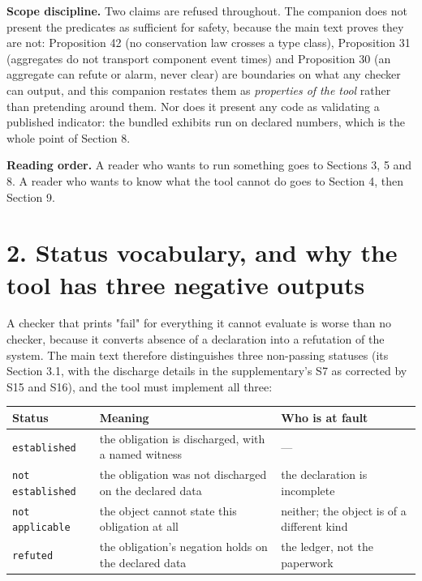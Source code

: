 \documentclass[11pt]{article}
\begin{document}
\textbf{Scope discipline.} Two claims are refused throughout. The companion does not present the predicates as sufficient for safety, because the main text proves they are not: Proposition 42 (no conservation law crosses a type class), Proposition 31 (aggregates do not transport component event times) and Proposition 30 (an aggregate can refute or alarm, never clear) are boundaries on what any checker can output, and this companion restates them as \emph{properties of the tool} rather than pretending around them. Nor does it present any code as validating a published indicator: the bundled exhibits run on declared numbers, which is the whole point of Section 8.

\textbf{Reading order.} A reader who wants to run something goes to Sections 3, 5 and 8. A reader who wants to know what the tool cannot do goes to Section 4, then Section 9.

\vspace{0.8em}

\section*{2. Status vocabulary, and why the tool has three negative outputs}\label{2-status-vocabulary-and-why-the-tool-has-three-negative-outputs}

A checker that prints "fail" for everything it cannot evaluate is worse than no checker, because it converts absence of a declaration into a refutation of the system. The main text therefore distinguishes three non-passing statuses (its Section 3.1, with the discharge details in the supplementary's S7 as corrected by S15 and S16), and the tool must implement all three:

\begin{longtable}{@{}l|p{70mm}|l@{}}
\toprule
Status & Meaning & Who is at fault \\
\midrule
\texttt{established} & the obligation is discharged, with a named witness & --- \\
\texttt{not established} & the obligation was not discharged on the declared data & the declaration is incomplete \\
\texttt{not applicable} & the object cannot state this obligation at all & neither; the object is of a different kind \\
\texttt{refuted} & the obligation's negation holds on the declared data & the ledger, not the paperwork \\
\bottomrule
\end{longtable}
\end{document}
